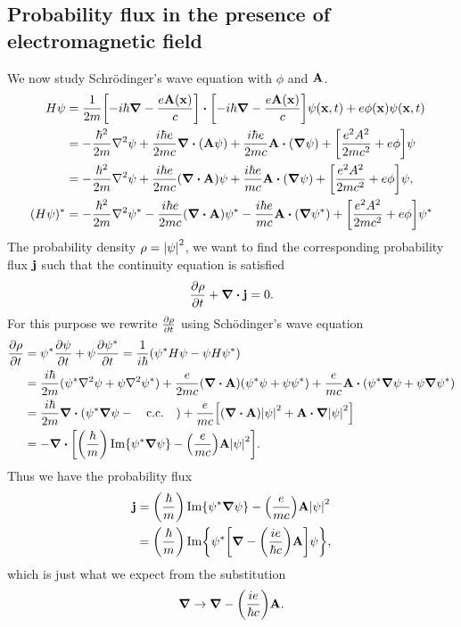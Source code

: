 \documentclass[10pt]{article}
\begin{document}
	\subsection{Probability flux in the presence of electromagnetic field}

	We now study Schr\"{o}dinger's wave equation with $\phi$ and ${\bf A}$.
	\begin{align*}
		H \psi &= \frac{1}{2m}\qty[-i\hbar \grad - \frac{e \bfA(\bfx) }{c}] \vdot \qty[-i\hbar \grad - \frac{e \bfA(\bfx) }{c}] \psi(\bfx,t) + e \phi(\bfx) \psi(\bfx,t)\\
		&= -\frac{\hbar^2}{2m} \laplacian \psi + \frac{i \hbar e}{2mc} \div(\bfA \psi) + \frac{i \hbar e}{2mc} \bfA \vdot (\grad{\psi}) + \qty[\frac{e^2 A^2}{2mc^2} + e \phi] \psi \\
		&= -\frac{\hbar^2}{2m} \laplacian \psi + \frac{i \hbar e}{2mc} (\div{\bfA}) \psi + \frac{i \hbar e}{mc} \bfA \vdot (\grad{\psi}) + \qty[\frac{e^2 A^2}{2mc^2} + e \phi] \psi, \\
		(H \psi)^* &= -\frac{\hbar^2}{2m} \laplacian \psi^* - \frac{i \hbar e}{2mc} (\div{\bfA}) \psi^* - \frac{i \hbar e}{mc} \bfA \vdot (\grad{\psi^*}) + \qty[\frac{e^2 A^2}{2mc^2} + e \phi] \psi^*\\
	\end{align*}
	The probability density $\rho = \abs{\psi}^2$, we want to find the corresponding probability flux ${\bf j}$ such that the continuity equation is satisfied
	\begin{equation}
		\pdv{\rho}{t} + \div{{\bf j}} = 0.
	\end{equation}
	For this purpose we rewrite $\pdv{\rho}{t}$ using Sch\"{o}dinger's wave equation
	\begin{align*}
		\pdv{\rho}{t} &= \psi^* \pdv{\psi}{t} + \psi \pdv{\psi^*}{t} = \frac{1}{i \hbar} (\psi^* H \psi - \psi H \psi^*)\\
		&= \frac{i \hbar}{2m}(\psi^* \laplacian \psi + \psi \laplacian \psi^*) + \frac{e}{2mc}(\div{\bfA})(\psi^* \psi + \psi \psi^*) + \frac{e}{mc} \bfA \vdot (\psi^* \grad{\psi} + \psi \grad{\psi^*}) \\
		&= \frac{i \hbar}{2m} \div(\psi^* \grad{\psi} - \qcc) + \frac{e}{mc}\qty[(\div{\bfA}) \abs{\psi}^2 + \bfA \vdot \grad{\abs{\psi}^2}] \\
		&= - \div[\qty(\frac{\hbar}{m}) \Im{\psi^* \grad{\psi}} - \qty(\frac{e}{mc}) \bfA \abs{\psi}^2].
	\end{align*}
	Thus we have the probability flux
	\begin{align*}
		{\bf j} &= \qty(\frac{\hbar}{m}) \Im{\psi^* \grad{\psi}} - \qty(\frac{e}{mc}) {\bf A} \abs{\psi}^2 \\
		&= \qty(\frac{\hbar}{m}) \Im{\psi^* \qty[\grad - \qty(\frac{i e}{\hbar c}) {\bf A}] \psi},
	\end{align*}
	which is just what we expect from the substitution
	\begin{equation}
		\grad \to \grad - \qty(\frac{i e}{\hbar c}) {\bf A}.
	\end{equation}
\end{document}
